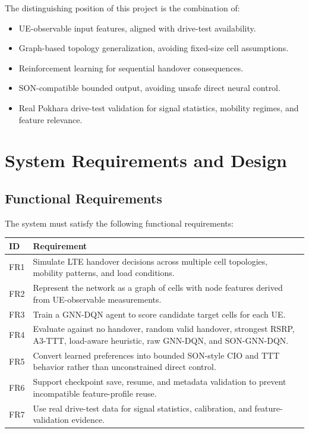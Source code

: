 \documentclass[12pt,a4paper]{report}
\begin{document}
The distinguishing position of this project is the combination of:
\begin{itemize}
    \item UE-observable input features, aligned with drive-test availability.
    \item Graph-based topology generalization, avoiding fixed-size cell assumptions.
    \item Reinforcement learning for sequential handover consequences.
    \item SON-compatible bounded output, avoiding unsafe direct neural control.
    \item Real Pokhara drive-test validation for signal statistics, mobility regimes, and feature relevance.
\end{itemize}

\chapter{System Requirements and Design}

\section{Functional Requirements}
The system must satisfy the following functional requirements:

\begin{longtable}{p{}p{}}
\toprule
\textbf{ID} & \textbf{Requirement}\\
\midrule
FR1 & Simulate LTE handover decisions across multiple cell topologies, mobility patterns, and load conditions.\\
FR2 & Represent the network as a graph of cells with node features derived from UE-observable measurements.\\
FR3 & Train a GNN-DQN agent to score candidate target cells for each UE.\\
FR4 & Evaluate against no handover, random valid handover, strongest RSRP, A3-TTT, load-aware heuristic, raw GNN-DQN, and SON-GNN-DQN.\\
FR5 & Convert learned preferences into bounded SON-style CIO and TTT behavior rather than unconstrained direct control.\\
FR6 & Support checkpoint save, resume, and metadata validation to prevent incompatible feature-profile reuse.\\
FR7 & Use real drive-test data for signal statistics, calibration, and feature-validation evidence.\\
\bottomrule
\end{longtable}
\end{document}
